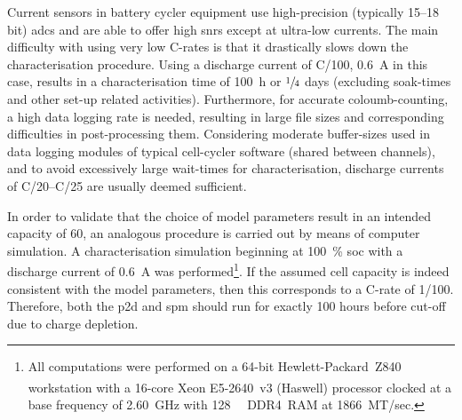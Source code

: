 Current sensors in battery cycler equipment use high-precision (typically 15--18
bit) \glspl{adc}  and are  able to  offer high  \glspl{snr} except  at ultra-low
currents. The main difficulty with using very low C-rates is that it drastically
slows down the  characterisation procedure. Using a discharge  current of C/100,
\ie{}  \SI{0.6}{\ampere} in  this case,  results in  a characterisation  time of
\SI{100}{\hour} or  $\sfrac{1}{4}$ days (excluding soak-times  and other
set-up related  activities). Furthermore, for accurate  coloumb-counting, a high
data logging  rate is needed,  resulting in  large file sizes  and corresponding
difficulties in post-processing them.  Considering moderate buffer-sizes used in
data logging modules of typical  cell-cycler software (shared between channels),
and  to  avoid  excessively  large wait-times  for  characterisation,  discharge
currents of C/20--C/25 are usually deemed sufficient.

In    order   to    validate    that   the    choice    of   model    parameters
result   in   an   intended   capacity  of   \SI{60}{\amphour},   an   analogous
procedure   is    carried   out   by    means   of   computer    simulation.   A
characterisation  simulation  beginning  at  \SI{100}{\percent}  \gls{soc}  with
a   discharge   current    of   \SI{0.6}{\ampere}   was   performed\footnote{All
computations  were  performed  on   a  64-bit  Hewlett-Packard~Z840  workstation
with   a   \mbox{16-core}   \mbox{\textsuperscript{\textregistered}}
\mbox{Xeon\textsuperscript{\textregistered}}     \mbox{E5-2640~v3}     (Haswell)
processor   clocked  at   a  base   frequency  of   \SI{2.60}{\giga\hertz}  with
\SI{128}{\giga\byte} DDR4~RAM at 1866~MT/sec.}. If  the assumed cell capacity is
indeed consistent with  the model parameters, then this corresponds  to a C-rate
of 1/100. Therefore, both the \gls{p2d} and \gls{spm} should run for exactly 100
hours before cut-off due to charge depletion.



